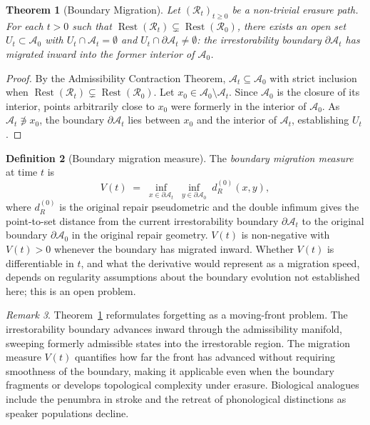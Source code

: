 \documentclass[12pt, oneside]{article}
\theoremstyle{plain}
\newtheorem{theorem}{Theorem}[section]
\theoremstyle{definition}
\newtheorem{definition}[theorem]{Definition}
\theoremstyle{remark}
\newtheorem{remark}[theorem]{Remark}
\DeclareMathOperator{\Rest}{Rest}
\newcommand{\At}{\mathcal{A}_t}
\newcommand{\Azero}{\mathcal{A}_0}
\newcommand{\Rt}{\mathcal{R}_t}
\newcommand{\Rzero}{\mathcal{R}_0}
\newcommand{\Restzt}{\Rest(\Rt)}
\newcommand{\Restzero}{\Rest(\Rzero)}
\begin{document}
\begin{theorem}[Boundary Migration]
  Let $(\Rt)_{t \geq 0}$ be a non-trivial erasure path.
  For each $t > 0$ such that $\Restzt \subsetneq \Restzero$,
  there exists an open set $U_t \subset \Azero$ with
  $U_t \cap \At = \emptyset$ and $U_t \cap \partial\At \neq
  \emptyset$: the irrestorability boundary $\partial\At$ has
  migrated inward into the former interior of $\Azero$.
  \label{thm:migration}
\end{theorem}

\begin{proof}
  By the Admissibility Contraction Theorem, $\At \subseteq \Azero$
  with strict inclusion when $\Restzt \subsetneq \Restzero$.
  Let $x_0 \in \Azero \setminus \At$.
  Since $\Azero$ is the closure of its interior, points arbitrarily
  close to $x_0$ were formerly in the interior of $\Azero$.
  As $\At \not\ni x_0$, the boundary $\partial\At$ lies between
  $x_0$ and the interior of $\At$, establishing $U_t$.
\end{proof}

\begin{definition}[Boundary migration measure]
  The \emph{boundary migration measure} at time $t$ is
  \[
    V(t)
    \;=\;
    \inf_{x \in \partial\At}\;
    \inf_{y \in \partial\Azero}\;
    d_R^{(0)}(x, y),
  \]
  where $d_R^{(0)}$ is the original repair pseudometric and the
  double infimum gives the point-to-set distance from the current
  irrestorability boundary $\partial\At$ to the original boundary
  $\partial\Azero$ in the original repair geometry.
  $V(t)$ is non-negative with $V(t) > 0$ whenever the boundary has
  migrated inward.
  Whether $V(t)$ is differentiable in $t$, and what the derivative
  would represent as a migration speed, depends on regularity
  assumptions about the boundary evolution not established here;
  this is an open problem.
\end{definition}

\begin{remark}
  Theorem~\ref{thm:migration} reformulates forgetting as a
  moving-front problem.
  The irrestorability boundary advances inward through the
  admissibility manifold, sweeping formerly admissible states into
  the irrestorable region.
  The migration measure $V(t)$ quantifies how far the front has
  advanced without requiring smoothness of the boundary, making it
  applicable even when the boundary fragments or develops
  topological complexity under erasure.
  Biological analogues include the penumbra in stroke and the
  retreat of phonological distinctions as speaker populations
  decline.
\end{remark}
\end{document}
